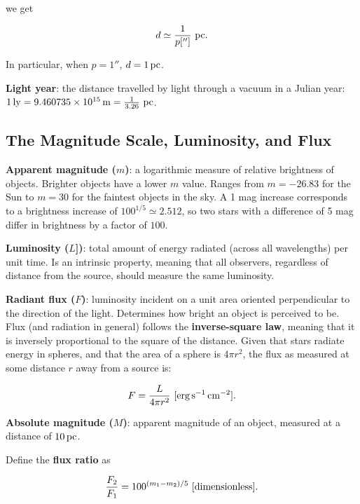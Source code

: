 \documentclass[a4paper,10pt]{article}
\begin{document}
we get

\begin{align*}
    d \simeq \frac{1}{p['']}~{\rm pc}.
\end{align*}

In particular, when $p = 1''$, $d = 1\,{\rm pc}$.

\textbf{Light year}: the distance travelled by light through a vacuum in a Julian year: $1\,{\rm ly} = 9.460735\times 10^{15}\,{\rm m} = \frac{1}{3.26}~{\rm pc}$.

\subsection{The Magnitude Scale, Luminosity, and Flux}

\textbf{Apparent magnitude ($m$)}: a logarithmic measure of relative brightness of objects. Brighter objects have a lower $m$ value. Ranges from $m=-26.83$ for the Sun to $m=30$ for the faintest objects in the sky. A 1 mag increase corresponds to a brightness increase of $100^{1/5} \simeq 2.512$, so two stars with a difference of 5 mag differ in brightness by a factor of $100$. 

\textbf{Luminosity ($L$])}: total amount of energy radiated (across all wavelengths) per unit time. Is an intrinsic property, meaning that all observers, regardless of distance from the source, should measure the same luminosity.

\textbf{Radiant flux ($F$)}: luminosity incident on a unit area oriented perpendicular to the direction of the light. Determines how bright an object is perceived to be. Flux (and radiation in general) follows the \textbf{inverse-square law}, meaning that it is inversely proportional to the square of the distance. Given that stars radiate energy in spheres, and that the area of a sphere is $4\pi r^2$, the flux as measured at some distance $r$ away from a source is:

\begin{align*}
    F = \frac{L}{4\pi r^2}~[{\rm erg\,s^{-1}\,cm^{-2}}].
\end{align*}

\textbf{Absolute magnitude ($M$)}: apparent magnitude of an object, measured at a distance of $10\,{\rm pc}$.

Define the \textbf{flux ratio} as 

\begin{align*}
    \frac{F_2}{F_1} = 100^{(m_1-m_2)/5}~[{\rm dimensionless}].
\end{align*}
\end{document}
